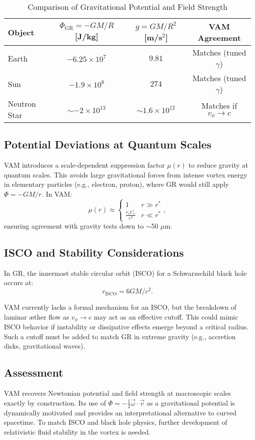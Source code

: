 \begin{table}[H]
    \centering
    \caption{Comparison of Gravitational Potential and Field Strength}
    \begin{tabular}{lccc}
        \toprule
        Object & $\Phi_\text{GR} = -GM/R$ [J/kg] & $g = GM/R^2$ [m/s$^2$] & VAM Agreement \\
        \midrule
        Earth & $-6.25\times10^7$ & $9.81$ & Matches (tuned $\gamma$) \\
        Sun & $-1.9\times10^8$ & $274$ & Matches (tuned $\gamma$) \\
        Neutron Star & $\sim -2\times10^{13}$ & $\sim 1.6\times10^{12}$ & Matches if $v_\phi \rightarrow c$ \\
        \bottomrule
    \end{tabular}
\end{table}

\subsection{Potential Deviations at Quantum Scales}
VAM introduces a scale-dependent suppression factor $\mu(r)$ to reduce gravity at quantum scales. This avoids large gravitational forces from intense vortex energy in elementary particles (e.g., electron, proton), where GR would still apply $\Phi = -GM/r$. In VAM:
\begin{equation}
    \mu(r) \approx \begin{cases}
                       1 & r \gg r^* \\
                       \frac{r_c C_e}{r^2} & r \ll r^*
    \end{cases},
\end{equation}
ensuring agreement with gravity tests down to $\sim$50 $\mu$m.

\subsection{ISCO and Stability Considerations}
In GR, the innermost stable circular orbit (ISCO) for a Schwarzschild black hole occurs at:
\begin{equation}
    r_\text{ISCO} = 6GM/c^2.
\end{equation}

VAM currently lacks a formal mechanism for an ISCO, but the breakdown of laminar æther flow as $v_\phi \rightarrow c$ may act as an effective cutoff. This could mimic ISCO behavior if instability or dissipative effects emerge beyond a critical radius. Such a cutoff must be added to match GR in extreme gravity (e.g., accretion disks, gravitational waves).

\subsection{Assessment}
VAM recovers Newtonian potential and field strength at macroscopic scales exactly by construction. Its use of $\Phi = -\tfrac{1}{2}\vec{\omega}\cdot\vec{v}$ as a gravitational potential is dynamically motivated and provides an interpretational alternative to curved spacetime. To match ISCO and black hole physics, further development of relativistic fluid stability in the vortex is needed.

